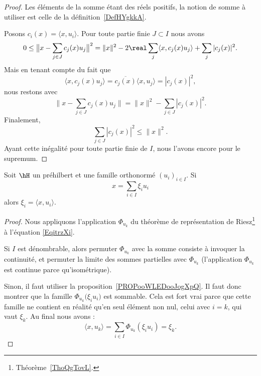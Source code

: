 \begin{proof}
    Les éléments de la somme étant des réels positifs, la notion de somme à utiliser est celle de la définition~\ref{DefHYgkkA}.

    Posons \( c_i(x)=\langle x, u_i\rangle \). Pour toute partie finie \( J\subset I\) nous avons
    \begin{equation}
        0\leq \big\| x-\sum_{j\in J}c_j(x)u_j \big\|^2=\| x \|^2-2\real\sum_{j}\langle x, c_j(x)u_j\rangle +\sum_j| c_j(x) |^2.
    \end{equation}
    Mais en tenant compte du fait que
    \begin{equation}
        \langle x, c_j(x)u_j\rangle =\overline{  c_j(x)}\langle x, u_j\rangle =| c_j(x) |^2,
    \end{equation}
    nous restons avec
    \begin{equation}    \label{EqvwXWEA}
        \| x-\sum_{j\in J}c_j(x)u_j \|=\| x \|^2-\sum_{j\in J}| c_j(x) |^2.
    \end{equation}
    Finalement,
    \begin{equation}
        \sum_{j\in J}| c_j(x) |^2\leq \| x \|^2.
    \end{equation}
    Ayant cette inégalité pour toute partie finie de \( I\), nous l'avons encore pour le supremum.
\end{proof}

\begin{proposition}     \label{PROPooWTOZooYZdlml}
    Soit \( \hH\) un préhilbert et une famille orthonormé \( (u_i)_{i\in I} \). Si
    \begin{equation}        \label{EqitrzXi}
        x=\sum_{i\in I}\xi_iu_i
    \end{equation}
    alors \( \xi_i=\langle x, u_i\rangle \).
\end{proposition}

\begin{proof}
    Nous appliquons l'application \( \Phi_{u_k}\) du théorème de représentation de Riesz\footnote{Théorème~\ref{ThoQgTovL}.} à l'équation \eqref{EqitrzXi}.

    Si \( I\) est dénombrable, alors permuter \( \Phi_{u_k}\) avec la somme consiste à invoquer la continuité, et permuter la limite des sommes partielles avec \( \Phi_{u_k}\) (l'application \( \Phi_{u_k}\) est continue parce qu'isométrique).

    Sinon, il faut utiliser la proposition~\ref{PROPooWLEDooJogXpQ}. Il faut donc montrer que la famille \( \Phi_{u_k}\big( \xi_iu_i \big)\) est sommable. Cela est fort vrai parce que cette famille ne contient en réalité qu'en seul élément non nul, celui avec \( i=k\), qui vaut \( \xi_k\). Au final nous avons :
    \begin{equation}
        \langle x, u_k\rangle =\sum_{i\in I}\Phi_{u_k}(\xi_iu_i)=\xi_k.
    \end{equation}
\end{proof}

